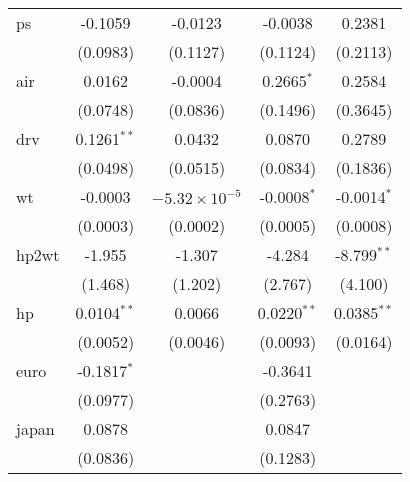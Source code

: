 \begin{tabular}{lcccc}
   ps                                           & -0.1059         & -0.0123                & -0.0038                & 0.2381\\   
                                                & (0.0983)        & (0.1127)               & (0.1124)               & (0.2113)\\   
   air                                          & 0.0162          & -0.0004                & 0.2665$^{*}$           & 0.2584\\   
                                                & (0.0748)        & (0.0836)               & (0.1496)               & (0.3645)\\   
   drv                                          & 0.1261$^{**}$   & 0.0432                 & 0.0870                 & 0.2789\\   
                                                & (0.0498)        & (0.0515)               & (0.0834)               & (0.1836)\\   
   wt                                           & -0.0003         & $-5.32\times 10^{-5}$  & -0.0008$^{*}$          & -0.0014$^{*}$\\   
                                                & (0.0003)        & (0.0002)               & (0.0005)               & (0.0008)\\   
   hp2wt                                        & -1.955          & -1.307                 & -4.284                 & -8.799$^{**}$\\   
                                                & (1.468)         & (1.202)                & (2.767)                & (4.100)\\   
   hp                                           & 0.0104$^{**}$   & 0.0066                 & 0.0220$^{**}$          & 0.0385$^{**}$\\   
                                                & (0.0052)        & (0.0046)               & (0.0093)               & (0.0164)\\   
   euro                                         & -0.1817$^{*}$   &                        & -0.3641                &   \\   
                                                & (0.0977)        &                        & (0.2763)               &   \\   
   japan                                        & 0.0878          &                        & 0.0847                 &   \\   
                                                & (0.0836)        &                        & (0.1283)               &   \\   

\end{tabular}
